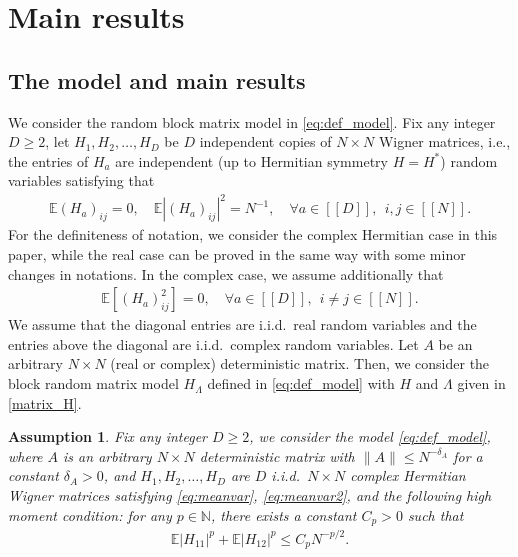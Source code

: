\documentclass[10pt,reqno]{amsart}
\numberwithin{equation}{section}
\numberwithin{figure}{section}
\theoremstyle{plain} %
\newtheorem{assumption}{Assumption}
\theoremstyle{definition} %
\newcommand{\E}{\mathbb{E}}
\newcommand{\N}{\mathbb{N}}
\renewcommand{\leq}{\le}
\renewcommand{\geq}{\ge}
\newcommand{\qq}[1]{[\![{#1}]\!]}
\numberwithin{equation}{section}
\begin{document}
\section{Main results}
\label{sec:main_results}

\subsection{The model and main results}

We consider the random block matrix model in \eqref{eq:def_model}. Fix any integer $D\geq 2$, let $H_1,H_2,\ldots, H_D$ be $D$ independent copies of $N\times N$ Wigner matrices, i.e., the entries of $H_a$ are independent (up to Hermitian symmetry $H=H^*$) random variables satisfying that 
\begin{equation}\label{eq:meanvar}
    \begin{aligned}
        \E(H_{a})_{ij}=0,\quad \E |(H_{a})_{ij}|^2 = {N}^{-1},\quad \forall a \in \qq{D},\ \ i,j \in \qq{N}.
    \end{aligned}
\end{equation}
For the definiteness of notation, we consider the complex Hermitian case in this paper, while the real case can be proved in the same way with some minor changes in notations. In the complex case, we assume additionally that 
\begin{equation}\label{eq:meanvar2}
    \begin{aligned}
        \E [(H_{a})^2_{ij}] = 0,\quad \forall a \in \qq{D},\ \ i\ne j \in \qq{N}.
    \end{aligned}  
\end{equation}
We assume that the diagonal entries are i.i.d.~real random variables and the entries above the diagonal are i.i.d.~complex random variables. Let $A$ be an arbitrary $N\times N$ (real or complex) deterministic matrix. Then, we consider the block random matrix model $H_{\Lambda}$ defined in \eqref{eq:def_model} with $H$ and $\Lambda$ given in \eqref{matrix_H}.





\begin{assumption}\label{main_assm}
Fix any integer $D\ge 2$, we consider the model \eqref{eq:def_model}, where $A$ is an arbitrary $N\times N$ deterministic matrix with $\|A\|\le N^{-\delta_A}$ for a constant $\delta_A>0$, and $H_1,H_2,\ldots, H_D$ are $D$ i.i.d.~$N\times N$ complex Hermitian Wigner matrices satisfying \eqref{eq:meanvar}, \eqref{eq:meanvar2}, and the following high moment condition: for any $p\in \N$, there exists a constant $C_p>0$ such that 
\begin{equation}\label{eq:highmoment}
    \begin{aligned}
       \E |H_{11}|^p  + \E |H_{12}|^p \leq C_pN^{-p/2}. 
    \end{aligned}
\end{equation}
\end{assumption}
\end{document}
